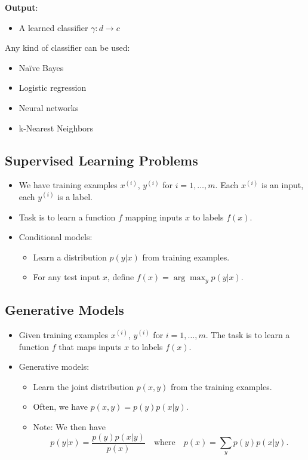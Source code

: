 \documentclass{book}
\begin{document}
    \textbf{Output}:
    \begin{itemize}
        \item A learned classifier $\gamma: d \to c$
    \end{itemize}

    Any kind of classifier can be used:
    \begin{itemize}
        \item Naïve Bayes
        \item Logistic regression
        \item Neural networks
        \item k-Nearest Neighbors
    \end{itemize}

 \subsection{Supervised Learning Problems}
  \begin{itemize}
    \item We have training examples $x^{(i)}$, $y^{(i)}$ for $i = 1, \ldots, m$. Each $x^{(i)}$ is an input, each $y^{(i)}$ is a label.
    \item Task is to learn a function $f$ mapping inputs $x$ to labels $f(x)$.
    \item Conditional models:
    \begin{itemize}
      \item Learn a distribution $p(y|x)$ from training examples.
      \item For any test input $x$, define $f(x) = \arg \max_y p(y|x)$.
    \end{itemize}
  \end{itemize}

  \subsection{Generative Models}
  \begin{itemize}
    \item Given training examples $x^{(i)}$, $y^{(i)}$ for $i = 1, \ldots, m$. The task is to learn a function $f$ that maps inputs $x$ to labels $f(x)$.
    \item Generative models:
    \begin{itemize}
      \item Learn the joint distribution $p(x, y)$ from the training examples.
      \item Often, we have $p(x, y) = p(y)p(x|y)$.
      \item Note: We then have
      \[
        p(y|x) = \frac{p(y)p(x|y)}{p(x)} \quad \text{where} \quad p(x) = \sum_y p(y)p(x|y).
      \]
    \end{itemize}
  \end{itemize}
\end{document}
